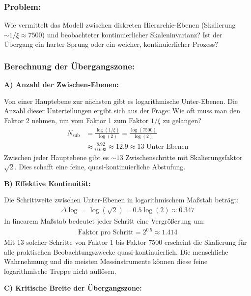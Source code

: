 \documentclass[12pt,a4paper]{article}
\begin{document}
	\subsubsection*{Problem:}
	Wie vermittelt das Modell zwischen diskreten Hierarchie-Ebenen (Skalierung $\sim 1/\xi \approx 7500$) und beobachteter kontinuierlicher Skaleninvarianz? Ist der Übergang ein harter Sprung oder ein weicher, kontinuierlicher Prozess?
	
	\subsubsection*{Berechnung der Übergangszone:}
	
	\textbf{A) Anzahl der Zwischen-Ebenen:}
	
	Von einer Hauptebene zur nächsten gibt es logarithmische Unter-Ebenen. Die Anzahl dieser Unterteilungen ergibt sich aus der Frage: Wie oft muss man den Faktor 2 nehmen, um vom Faktor 1 zum Faktor $1/\xi$ zu gelangen?
	\begin{align*}
		N_{\text{sub}} &= \frac{\log(1/\xi)}{\log(2)} = \frac{\log(7500)}{\log(2)} \\
		&\approx \frac{8.92}{0.693} \approx 12.9 \approx 13 \text{ Unter-Ebenen}
	\end{align*}
	Zwischen jeder Hauptebene gibt es $\sim 13$ Zwischenschritte mit Skalierungsfaktor $\sqrt{2}$. Dies schafft eine feine, quasi-kontinuierliche Abstufung.
	
	\textbf{B) Effektive Kontinuität:}
	
	Die Schrittweite zwischen Unter-Ebenen in logarithmischem Maßstab beträgt:
	\begin{align*}
		\Delta \log = \log(\sqrt{2}) = 0.5 \log(2) \approx 0.347
	\end{align*}
	In linearem Maßstab bedeutet jeder Schritt eine Vergrößerung um:
	\begin{align*}
		\text{Faktor pro Schritt} = 2^{0.5} \approx 1.414
	\end{align*}
	Mit 13 solcher Schritte von Faktor 1 bis Faktor 7500 erscheint die Skalierung für alle praktischen Beobachtungszwecke quasi-kontinuierlich. Die menschliche Wahrnehmung und die meisten Messinstrumente können diese feine logarithmische Treppe nicht auflösen.
	
	\textbf{C) Kritische Breite der Übergangszone:}
	
\end{document}
